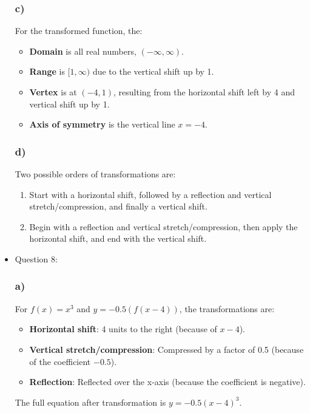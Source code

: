 \documentclass{article}
\begin{document}
\begin{itemize}
\subsubsection*{c)}
For the transformed function, the:
\begin{itemize}
    \item \textbf{Domain} is all real numbers, \( (-\infty, \infty) \).
    \item \textbf{Range} is \( [1, \infty) \) due to the vertical shift up by 1.
    \item \textbf{Vertex} is at \( (-4, 1) \), resulting from the horizontal shift left by 4 and vertical shift up by 1.
    \item \textbf{Axis of symmetry} is the vertical line \( x = -4 \).
\end{itemize}

\subsubsection*{d)}
Two possible orders of transformations are:
\begin{enumerate}
    \item Start with a horizontal shift, followed by a reflection and vertical stretch/compression, and finally a vertical shift.
    \item Begin with a reflection and vertical stretch/compression, then apply the horizontal shift, and end with the vertical shift.
\end{enumerate}
\item Question 8:
\subsubsection*{a)}
For \( f(x) = x^3 \) and \( y = -0.5(f(x - 4)) \), the transformations are:
\begin{itemize}
    \item \textbf{Horizontal shift}: 4 units to the right (because of \( x - 4 \)).
    \item \textbf{Vertical stretch/compression}: Compressed by a factor of 0.5 (because of the coefficient \( -0.5 \)).
    \item \textbf{Reflection}: Reflected over the x-axis (because the coefficient is negative).
\end{itemize}
The full equation after transformation is \( y = -0.5(x - 4)^3 \).


\end{itemize}
\end{document}
